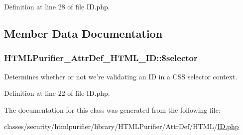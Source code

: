 Definition at line 28 of file I\+D.\+php.



\subsection{Member Data Documentation}
\hypertarget{classHTMLPurifier__AttrDef__HTML__ID_a7a0c9b401031cff44d814aa25591d180}{
\subsubsection[{\$selector}]{\setlength{\rightskip}{0pt plus 5cm}H\+T\+M\+L\+Purifier\+\_\+\+Attr\+Def\+\_\+\+H\+T\+M\+L\+\_\+\+I\+D\+::\$selector\hspace{0.3cm}{\ttfamily [protected]}}}\label{classHTMLPurifier__AttrDef__HTML__ID_a7a0c9b401031cff44d814aa25591d180}
Determines whether or not we're validating an I\+D in a C\+S\+S selector context. 

Definition at line 22 of file I\+D.\+php.



The documentation for this class was generated from the following file\+:\begin{DoxyCompactItemize}
\item 
classes/security/htmlpurifier/library/\+H\+T\+M\+L\+Purifier/\+Attr\+Def/\+H\+T\+M\+L/\hyperlink{AttrDef_2HTML_2ID_8php}{I\+D.\+php}\end{DoxyCompactItemize}
